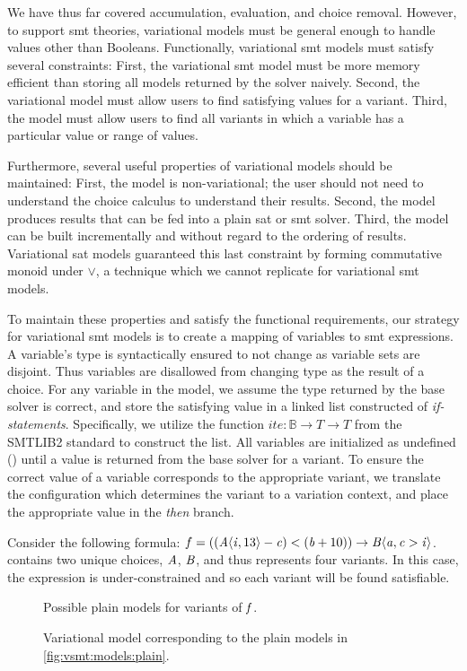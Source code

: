 \label{section:vsmt:models}
We have thus far covered accumulation, evaluation, and choice removal. However,
to support \ac{smt} theories, variational models must be general enough to
handle values other than Booleans. Functionally, variational \ac{smt} models
must satisfy several constraints: First, the variational \ac{smt} model must be
more memory efficient than storing all models returned by the solver naively.
Second, the variational model must allow users to find satisfying values for a
variant. Third, the model must allow users to find all variants in which a
variable has a particular value or range of values.

Furthermore, several useful properties of variational models should be
maintained: First, the model is non-variational; the user should not need to
understand the choice calculus to understand their results. Second, the model
produces results that can be fed into a plain \ac{sat} or \ac{smt} solver.
Third, the model can be built incrementally and without regard to the ordering
of results. Variational \ac{sat} models guaranteed this last constraint by
forming commutative monoid under $\vee$, a technique which we cannot replicate
for variational \ac{smt} models.

To maintain these properties and satisfy the functional requirements, our
strategy for variational \ac{smt} models is to create a mapping of variables to
\ac{smt} expressions. A variable's type is syntactically ensured to not change
as variable sets are disjoint. Thus variables are disallowed from changing type
as the result of a choice. For any variable in the model, we assume the type
returned by the base solver is correct, and store the satisfying value in a
linked list constructed of \emph{if-statements}. Specifically, we utilize the
function $ite : \mathbb{B} \rightarrow T \rightarrow T$ from the SMTLIB2
standard to construct the list. All variables are initialized as undefined
(\undefined) until a value is returned from the base solver for a variant. To
ensure the correct value of a variable corresponds to the appropriate variant,
we translate the configuration which determines the variant to a variation
context, and place the appropriate value in the \emph{then} branch.

Consider the following \evpl{} formula: $f = ((\chc[A]{\iV{}, 13} - \cV{}) <
(\bV + 10)) \rightarrow \chc[B]{\aV{}, \cV{} > \iV{}}$. \fV{} contains two
unique choices, $\mathit{A}$, $\mathit{B}$, and thus represents four variants. In this
case, the expression is under-constrained and so each variant will be found
satisfiable.
%
\begin{figure}[h]
  \centering
  
  \caption{Possible plain models for variants of $\mathit{f}$.}%
  \label{fig:vsmt:models:plain}
\end{figure}
\begin{figure}[h]
  \centering
  
  \caption{Variational model corresponding to the plain models in
    \autoref{fig:vsmt:models:plain}.}%
  \label{fig:vsmt:models:var}
\end{figure}

